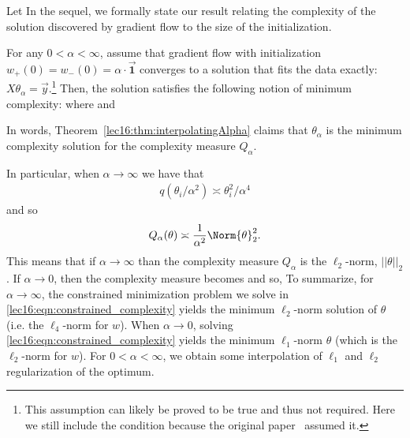 Let
In the sequel, we formally state our result relating the complexity of the solution discovered by gradient flow to the size of the initialization.
\begin{theorem}
	 \label{lec16:thm:interpolatingAlpha}
For any $0 < \alpha < \infty$, assume that gradient flow with initialization $w_+(0) = w_-(0) = \alpha \cdot \vec{\mathbf{1}}$ converges to a solution that fits the data exactly: $X \theta_{\alpha} = \vec{y}$.\footnote{This assumption can likely be proved to be true and thus not required. Here we still include the condition because the original paper~\citet{woodworth2020kernel} assumed it.}  Then, the solution satisfies the following notion of minimum complexity:
where
and
\end{theorem}
In words, Theorem~\ref{lec16:thm:interpolatingAlpha} claims that $\theta_\alpha$ is the minimum complexity solution for the complexity measure $Q_\alpha$.

\begin{remark}
In particular, when $\alpha \to \infty$ we have that 
\begin{align}
    q(\theta_i /\alpha^2) \asymp \theta_i^2/\alpha^4
\end{align}
and so 
\begin{align}
    Q_\alpha(\theta) \asymp \frac{1}{\alpha^2} \Norm{\theta}_2^2.
\end{align}
This means that if $\alpha \to \infty$ than the complexity measure $Q_\alpha$ is the $\ell_2$-norm, $||\theta||_2$.  If $\alpha \to 0$, then the complexity measure becomes
and so,
To summarize, for $\alpha \to \infty$, the constrained minimization problem we solve in \eqref{lec16:eqn:constrained_complexity} yields the minimum $\ell_2$-norm solution of $\theta$ (i.e. the $\ell_4$-norm for $w$).  When $\alpha \to 0$, solving \eqref{lec16:eqn:constrained_complexity} yields the minimum $\ell_1$-norm $\theta$ (which is the $\ell_2$-norm for $w$).  For $0 < \alpha < \infty$, we obtain some interpolation of $\ell_1$ and $\ell_2$ regularization of the optimum.
\end{remark}

